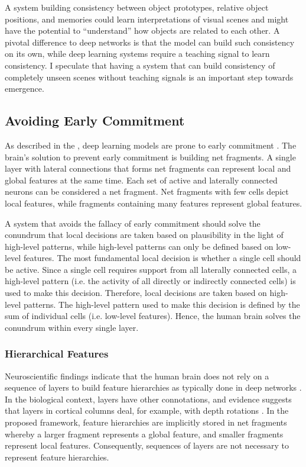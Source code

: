 A system building consistency between object prototypes, relative object positions, and memories could learn interpretations of visual scenes and might have the potential to ``understand'' how objects are related to each other. A pivotal difference to deep networks is that the model can build such consistency on its own, while deep learning systems require a teaching signal to learn consistency.
I speculate that having a system that can build consistency of completely unseen scenes without teaching signals is an important step towards emergence.


\subsection{Avoiding Early Commitment}
As described in the , deep learning models are prone to early commitment .
The brain's solution to prevent early commitment is building net fragments.
A single layer with lateral connections that forms net fragments can represent local and global features at the same time.
Each set of active and laterally connected neurons can be considered a net fragment. Net fragments with few cells depict local features, while fragments containing many features represent global features.

A system that avoids the fallacy of early commitment should solve the conundrum that local decisions are taken based on plausibility in the light of high-level patterns, while high-level patterns can only be defined based on low-level features.
The most fundamental local decision is whether a single cell should be active. Since a single cell requires support from all laterally connected cells, a high-level pattern (i.e. the activity of all directly or indirectly connected cells) is used to make this decision. Therefore, local decisions are taken based on high-level patterns. The high-level pattern used to make this decision is defined by the sum of individual cells (i.e. low-level features). Hence, the human brain solves the conundrum within every single layer.


\subsubsection{Hierarchical Features}
Neuroscientific findings indicate that the human brain does not rely on a sequence of layers to build feature hierarchies as typically done in deep networks .
In the biological context, layers have other connotations, and evidence suggests that layers in cortical columns deal, for example, with depth rotations .
In the proposed framework, feature hierarchies are implicitly stored in net fragments whereby a larger fragment represents a global feature, and smaller fragments represent local features.
Consequently, sequences of layers are not necessary to represent feature hierarchies.

